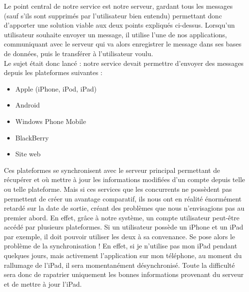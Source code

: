 \documentclass{article}
\begin{document}
Le point central de notre service est notre serveur, gardant tous les messages (sauf s’ils sont supprimés par l’utilisateur bien entendu) permettant donc d’apporter une solution viable aux deux points expliqués ci-dessus. Lorsqu'un utilisateur souhaite envoyer un message, il utilise l'une de nos applications, communiquant avec le serveur qui va alors enregistrer le message dans ses bases de données, puis le transférer à l'utilisateur voulu. \\
	
Le sujet était donc lancé : notre service devait permettre d’envoyer des messages depuis les plateformes suivantes :
	\begin{itemize}
		\item Apple (iPhone, iPod, iPad)
		\item Android
		\item Windows Phone Mobile
		\item BlackBerry
		\item Site web\\
	\end{itemize}

Ces plateformes se synchronisent avec le serveur principal permettant de récupérer et où mettre à jour les informations modifiées d’un compte depuis telle ou telle plateforme. Mais si ces services que les concurrents ne possèdent pas permettent de créer un avantage comparatif, ils nous ont en réalité énormément retardé sur la date de sortie, créant des problèmes que nous n’envisagions pas au premier abord. En effet, grâce à notre système, un compte utilisateur peut-être accédé par plusieurs plateformes. Si un utilisateur possède un iPhone et un iPad par exemple, il doit pouvoir utiliser les deux à sa convenance.  Se pose alors le problème de la synchronisation ! En effet, si je n’utilise pas mon iPad pendant quelques jours, mais activement l’application sur mon téléphone,  au moment du rallumage de l’iPad, il sera momentanément désynchronisé. Toute la difficulté sera donc de rapatrier uniquement les bonnes informations provenant du serveur et de mettre à jour l’iPad.\\
\end{document}
